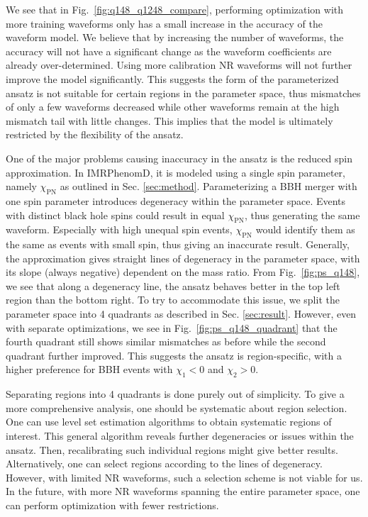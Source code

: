 \documentclass[twocolumn]{aastex631}
\begin{document}
We see that in Fig.~\ref{fig:q148_q1248_compare}, performing optimization with
more training waveforms only has a small increase in the accuracy of the
waveform model. We believe that by increasing the number of waveforms, the
accuracy will not have a significant change as the waveform coefficients are
already over-determined. Using more calibration NR waveforms will not further
improve the model significantly. This suggests the form of the parameterized
ansatz is not suitable for certain regions in the parameter space, thus
mismatches of only a few waveforms decreased while other waveforms remain at the
high mismatch tail with little changes. This implies that the model is
ultimately restricted by the flexibility of the ansatz. 

One of the major problems causing inaccuracy in the ansatz is the reduced spin
approximation. In IMRPhenomD, it is modeled using a single spin parameter,
namely $\chi_{\mathrm{PN}}$ as outlined in Sec. \ref{sec:method}. Parameterizing
a BBH merger with one spin parameter introduces degeneracy within the parameter
space. Events with distinct black hole spins could result in equal
$\chi_{\mathrm{PN}}$, thus generating the same waveform. Especially with high
unequal spin events, $\chi_{\mathrm{PN}}$ would identify them as the same as
events with small spin, thus giving an inaccurate result. Generally, the
approximation gives straight lines of degeneracy in the parameter space, with
its slope (always negative) dependent on the mass ratio. From
Fig.~\ref{fig:ps_q148}, we see that along a degeneracy line, the ansatz behaves
better in the top left region than the bottom right. To try to accommodate this
issue, we split the parameter space into 4 quadrants as described in Sec.
\ref{sec:result}. However, even with separate optimizations, we see in
Fig.~\ref{fig:ps_q148_quadrant} that the fourth quadrant still shows similar
mismatches as before while the second quadrant further improved. This suggests
the ansatz is region-specific, with a higher preference for BBH events with
$\chi_1<0$ and $\chi_2>0$. 

Separating regions into 4 quadrants is done purely out of simplicity. To give a
more comprehensive analysis, one should be systematic about region selection.
One can use level set estimation algorithms to obtain systematic regions of
interest. This general algorithm reveals further degeneracies or issues within
the ansatz. Then, recalibrating such individual regions might give better
results. Alternatively, one can select regions according to the lines of
degeneracy. However, with limited NR waveforms, such a selection scheme is not
viable for us. In the future, with more NR waveforms spanning the entire
parameter space, one can perform optimization with fewer restrictions. 
\end{document}
